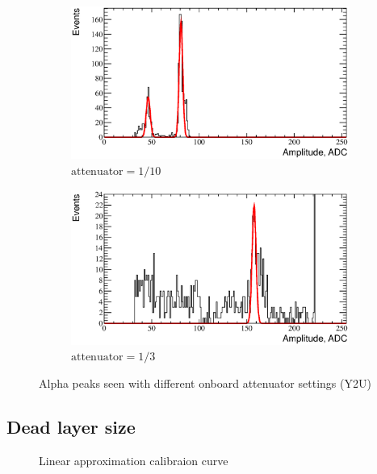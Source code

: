 \documentclass[a4paper,12pt]{article}
\begin{document}
\begin{figure}[htb]
\begin{subfigure}[t]{0.49\textwidth}
\includegraphics[width=\textwidth]{gfx/atten_1_over_10_ch06.eps}
\caption{$\text{attenuator}=1/10$}
\end{subfigure}
%
\hfill
%
\begin{subfigure}[t]{0.49\textwidth}
\includegraphics[width=\textwidth]{gfx/atten_1_over_3_ch06.eps}
\caption{$\text{attenuator}=1/3$}
\end{subfigure}
\caption{Alpha peaks seen with different onboard attenuator settings (Y2U)}
\label{fig:atten_distrib}
\end{figure}

\subsection{Dead layer size}

\begin{figure}
\vspace{-30pt}
\begin{center}

\end{center}
\caption{Linear approximation calibraion curve}
\label{fig:calib_curve}
\end{figure}
\end{document}
